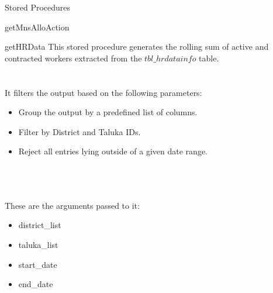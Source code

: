 \documentclass[
10pt, %
a4paper, %
oneside, %
headinclude,footinclude, %
BCOR5mm, %
]{scrartcl}
\begin{document}
\begin{section}{Stored Procedures}
\begin{subsection}{getMnsAlloAction}
\end{subsection}

\newpage

\begin{subsection}{getHRData}
This stored procedure generates the rolling sum of active and contracted workers extracted from the $tbl\_hrdatainfo$ table. \\ \\ \\
It filters the output based on the following parameters: 
\begin{itemize}
        \item Group the output by a predefined list of columns.
        \item Filter by District and Taluka IDs.
        \item Reject all entries lying outside of a given date range.
\end{itemize} 
\\ \\ \\

These are the arguments passed to it: 
\begin{itemize}
        \item district\_list
        \item taluka\_list
        \item start\_date
        \item end\_date
\end{itemize}

\end{subsection}

\newpage


\end{section}
\end{document}

